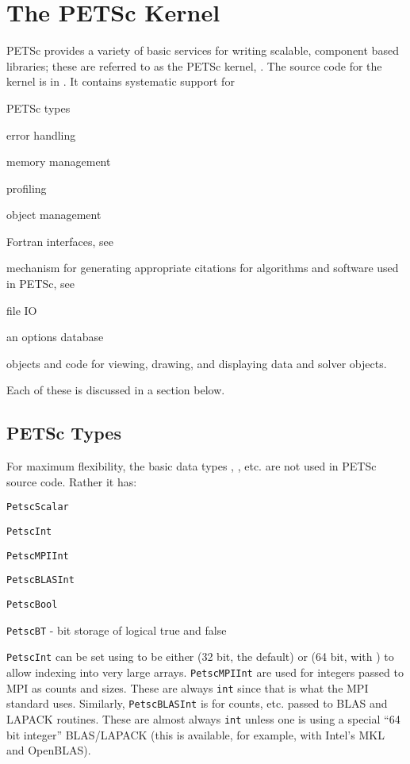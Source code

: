 \chapter{The PETSc Kernel}
\label{chapter:kernel}
PETSc provides a variety of basic services for writing scalable, component
based libraries; these are referred to as the PETSc kernel, \cite{bgms98}. The source
code for the kernel is in . It contains systematic support for
\begin{tightitemize}
  \item PETSc types
  \item error handling
  \item memory management
  \item profiling
  \item object management
  \item Fortran interfaces, see \cite{BalayBrownKnepleyMcInnesSmith2015}
  \item mechanism for generating appropriate citations for algorithms and software used in PETSc, see \cite{knepley2013accurately}
  \item file IO
  \item an options database
  \item objects and code for viewing, drawing, and displaying data and solver objects.
\end{tightitemize}
Each of these is discussed in a section below.

\section{PETSc Types}
For maximum flexibility, the basic data types , , etc. are
 not used in PETSc source code. Rather it has:
\begin{tightitemize}
  \item \lstinline{PetscScalar}
  \item \lstinline{PetscInt}
  \item \lstinline{PetscMPIInt}
  \item \lstinline{PetscBLASInt}
  \item \lstinline{PetscBool}
  \item \lstinline{PetscBT} - bit storage of logical true and false
\end{tightitemize}
\lstinline{PetscInt} can be set using  to be either  (32 bit, the default) or 
(64 bit, with ) to allow indexing into very large arrays. 
\lstinline{PetscMPIInt} are used for integers passed to MPI as counts and sizes. 
These are always \lstinline{int} since that is what the MPI standard uses. 
Similarly, \lstinline{PetscBLASInt} is for counts, etc. passed to BLAS and LAPACK routines. 
These are almost always \lstinline{int} unless one is using a special ``64 bit integer'' BLAS/LAPACK (this is available, for
example,  with Intel's MKL and OpenBLAS).

